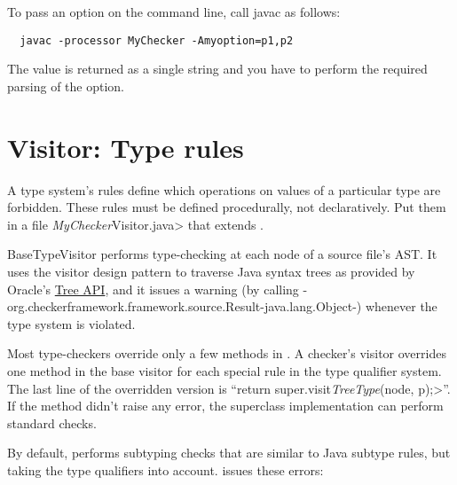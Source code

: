 To pass an option on the command line, call javac as follows:

\begin{Verbatim}
  javac -processor MyChecker -Amyoption=p1,p2
\end{Verbatim}

The value is returned as a single string and you have to perform the
required parsing of the option.




\section{Visitor: Type rules\label{creating-extending-visitor}}

A type system's rules define which operations on values of a
particular type are forbidden.
These rules must be defined procedurally, not declaratively.
Put them in a file \<\emph{MyChecker}Visitor.java> that extends
.

BaseTypeVisitor performs type-checking at each node of a
source file's AST\@.  It uses the visitor design pattern to traverse
Java syntax trees as provided by Oracle's
\href{https://docs.oracle.com/javase/8/docs/jdk/api/javac/tree/}{Tree
API},
and it issues a warning (by calling
{-org.checkerframework.framework.source.Result-java.lang.Object-})
whenever the type system is violated.

Most type-checkers
override only a few methods in .
A checker's visitor overrides one method in the base visitor for each special
rule in the type qualifier system.
The last line of the overridden version is
``\<return super.visit\emph{TreeType}(node, p);>''.
If the method didn't raise any error,
the superclass implementation can perform standard checks.


By default,  performs subtyping checks that are
similar to Java subtype rules, but taking the type qualifiers into account.
 issues these errors:

